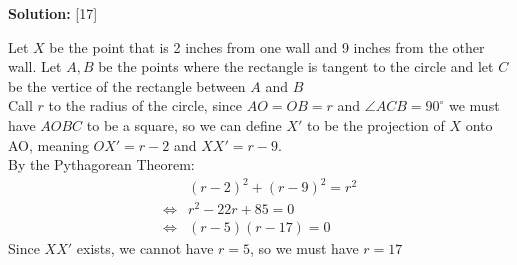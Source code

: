 \documentclass[12pt]{article}
\newenvironment{solution}{%
    \vspace{1em} %
    \noindent\textbf{Solution:}%
}{%
    \par
}
\begin{document}
\begin{solution}[17]
   \begin{center}
      \end{center}
      
    Let $X$ be the point that is 2 inches from one wall and 9 inches from the other wall.
    Let $A,B$ be the points where the rectangle is tangent to the circle and let $C$
    be the vertice of the rectangle between $A$ and $B$ \\
    Call $r$ to the radius of the circle, since $AO=OB=r$ and $\angle ACB = 90^\circ$ we
    must have $AOBC$ to be a square, so we can define $X'$ to be the projection of $X$ onto 
    AO, meaning $OX'=r-2$ and $XX'=r-9$. \\
    By the Pythagorean Theorem:
    \begin{align*}
        &(r-2)^2 + (r-9)^2 = r^2 \\
        \iff& r^2-22r+85=0 \\
        \iff& (r-5)(r-17)=0
    \end{align*}
    Since $XX'$ exists, we cannot have $r=5$, so we must have $r=17$
\end{solution}
\end{document}
